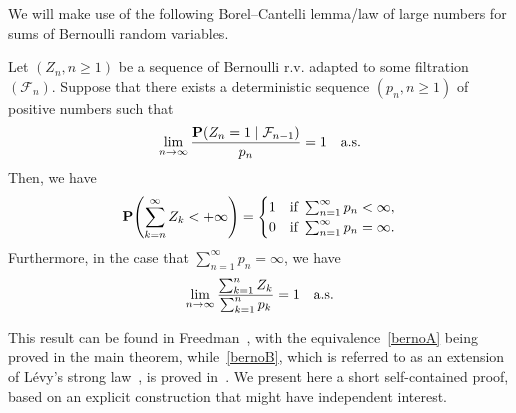 \documentclass[AHL,Unicode,longabstracts,published]{cedram}
\renewcommand{\P}{\mathbf{P}}
\newcommand{\clF}{\mathcal{F}}
\let\originalleft\left
\let\originalright\right
\renewcommand{\left}{\mathopen{}\mathclose\bgroup\originalleft}
\renewcommand{\right}{\aftergroup\egroup\originalright}
\renewcommand*{\to}{\mathchoice{\longrightarrow}{\rightarrow}{\rightarrow}{\rightarrow}}
\begin{document}
We will make use of the following Borel--Cantelli lemma/law of large numbers for sums of Bernoulli random variables.


\begin{lemm}\label{lem:llnber}
Let $(Z_n, n\geq 1)$ be a sequence of Bernoulli r.v. adapted to some filtration $(\clF_n)$. Suppose that there exists a deterministic sequence $(p_n, n\geq 1)$ of positive numbers such that
\[
\lim_{n\to\infty} \frac{\P(Z_{n} = 1\mid \clF_{n-1})}{p_n} = 1 \quad\text{a.s.}
\]
Then, we have
\begin{equation}\label{bernoA}
\P\left(\sum_{k=n}^\infty Z_k < +\infty\right) =
\begin{cases}
1 & \text{if }\sum_{n=1}^\infty p_n < \infty,\\
0 & \text{if }\sum_{n=1}^\infty p_n = \infty.
\end{cases}
\end{equation}
Furthermore, in the case that $\sum_{n=1}^\infty p_n = \infty$, we have
\begin{equation}\label{bernoB}
\lim_{n\to\infty}\frac{\sum_{k=1}^n Z_k}{\sum_{k=1}^n p_k} = 1\quad \text{a.s.}
\end{equation}
\end{lemm}

This result can be found in Freedman~\cite{Freedman}, with the equivalence~\eqref{bernoA} being proved in the main theorem, while~\eqref{bernoB}, which is referred to as an extension of Lévy's strong law~\cite[Chapter~6]{Levy}, is proved in~\cite[(40)]{Freedman}. We present here a short self-contained proof, based on an explicit construction that might have independent interest.
\end{document}
